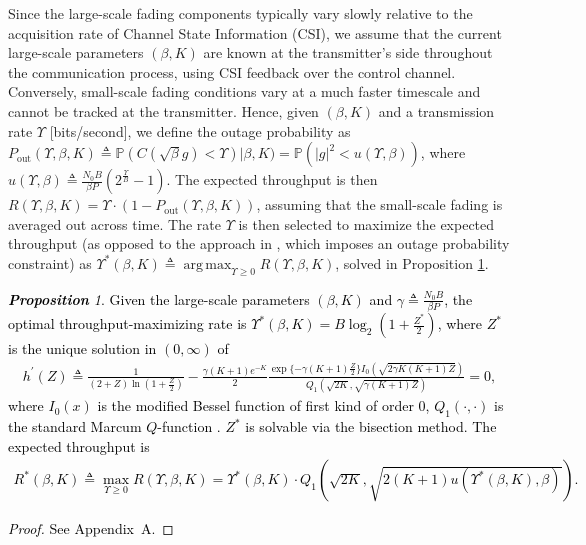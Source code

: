 \documentclass[12pt, draftcls, onecolumn]{IEEEtran}
\theoremstyle{plain}
\theoremstyle{definition}
\theoremstyle{remark}
\newtheorem{prop}{\textbf{Proposition}}
\DeclareMathOperator*{\argmax}{arg\,max}
\newcommand\hlt[1]{\textcolor{black}{#1}}
\begin{document}
Since the large-scale fading components typically vary slowly relative to the acquisition rate of Channel State Information (CSI), we assume that the current large-scale parameters $(\beta,K)$ are known at the transmitter's side throughout the communication process, using CSI feedback over the control channel. Conversely, small-scale fading conditions vary at a much faster timescale and cannot be tracked at the transmitter. 
Hence, given $(\beta,K)$ and a transmission rate $\Upsilon$ [bits/second], we define the outage probability as $P_{\mathrm{out}}(\Upsilon,\beta,K){\triangleq}\mathbb{P}(C(\sqrt{\beta}g){<}\Upsilon)|\beta,K){=}\mathbb{P}\left(|g|^{2}{<}u(\Upsilon,\beta)\right)$, where $u(\Upsilon,\beta){\triangleq}\frac{N_{0}B}{\beta P}(2^{\frac{\Upsilon}{B}}{-}1)$. The expected throughput is then $R(\Upsilon,\beta,K){=}\Upsilon{\cdot}\left(1{-}P_{\mathrm{out}}(\Upsilon,\beta,K)\right)$, assuming that the small-scale fading is averaged out across time. The rate $\Upsilon$ is then selected to maximize the expected throughput (as opposed to the approach in \cite{Rician}, which imposes an outage probability constraint) as $\Upsilon^{*}(\beta,K){\triangleq}\argmax_{\Upsilon{\geq}0}R(\Upsilon,\beta,K)$, solved in Proposition \ref{P1}.
\hlt{\begin{prop}\label{P1}
    Given the large-scale parameters $(\beta,K)$ and $\gamma{\triangleq}\frac{N_{0}B}{\beta P}$, the optimal throughput-maximizing rate is $\Upsilon^{*}(\beta,K){=}B\log_{2}\left(1{+}\frac{Z^*}{2}\right)$, where $Z^*$ is the unique solution in $(0,\infty)$ of
    \begin{align}\label{hprime}
        h^\prime(Z) \triangleq \frac{1}{(2{+}Z)\ln\left(1{+}\frac{Z}{2}\right)} - \frac{\gamma(K{+}1)e^{-K}}{2}\frac{\exp\{-\gamma(K+1)\frac{Z}{2}\}I_{0}(\sqrt{2\gamma K(K{+}1)Z})}{Q_{1}(\sqrt{2K},\sqrt{\gamma(K{+}1)Z})} = 0,
    \end{align}
    where $I_{0}(x)$ is the modified Bessel function of first kind of order $0$, $Q_{1}(\cdot,\cdot)$ is the standard Marcum $Q$-function \cite{Rician}. $Z^*$ is solvable via the bisection method. The expected throughput is
    \begin{align}
    	R^*(\beta,K) \triangleq \max_{\Upsilon \geq 0} R(\Upsilon, \beta, K) = \Upsilon^{*}(\beta, K) \cdot Q_{1} (\sqrt{2K}, \sqrt{2(K + 1) u(\Upsilon^{*}(\beta, K),\beta)}).
    \end{align}
\end{prop}
\begin{proof}
    See Appendix~A.
\end{proof}}
\end{document}
